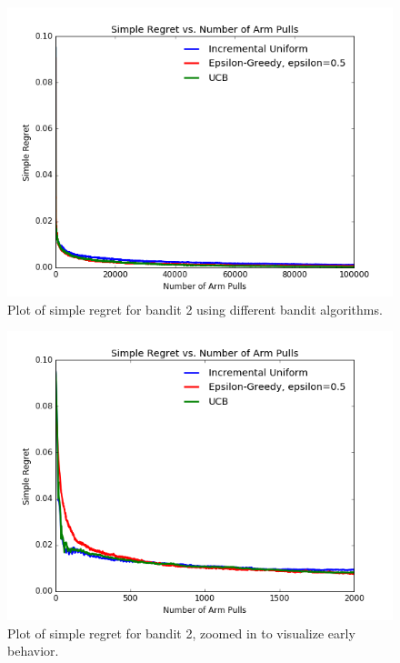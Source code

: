 \documentclass[paper=a4, fontsize=11pt]{scrartcl}
\begin{document}
\begin{figure}
\centering
	\includegraphics[width=.8\linewidth]{bandit2_simple_regret.png}
\caption{Plot of simple regret for bandit 2 using different bandit algorithms.}
\label{fig:simple_bandit2}
\end{figure}

\begin{figure}
\centering
	\includegraphics[width=1\linewidth]{bandit2_simple_regret_zoomed.png}
\caption{Plot of simple regret for bandit 2, zoomed in to visualize early behavior.}
\label{fig:simple_bandit2_zoomed}
\end{figure}
\end{document}
